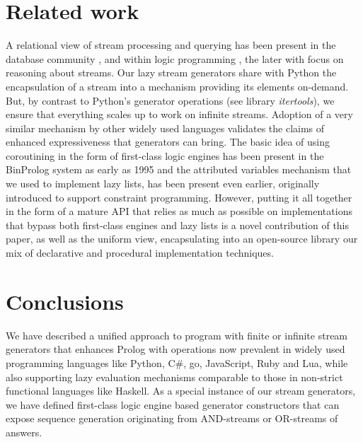\documentclass{new_tlp}
\begin{document}
\section{Related work}\label{rel}

\begin{comment}
Maybe?
\BI 
\I some history - see
\cite{tarau:parimp99,tarau:cl2000,iclp08:inter,ciclops08:pINTER}
\cite{coord11tarau}
\cite{bp2011}
\I work on delimited continuations \cite{delim}, hookable disjunction \cite{tor}
\I work on pipelines \cite{pipelines}
\EI
\end{comment}

A relational view of stream processing and querying has been 
present in the database community 
\cite{Law11,Babcock02},
and 
within logic programming 
\cite{Beck15}, %
the later with focus on
reasoning about streams.
Our lazy stream generators share with Python  \cite{pyref} the encapsulation of
a stream into a mechanism providing its elements on-demand. But, by contrast to
Python's generator operations (see library {\em itertools}), we ensure 
that everything scales up to work on infinite streams.
Adoption of a very similar mechanism by other widely
used languages validates the claims of 
enhanced expressiveness  that generators can bring.
The basic idea of using coroutining in the form of first-class logic engines
has been present in the BinProlog system  \cite{bp2011} as early as 1995 and
the attributed variables  mechanism \cite{holz92} that we used to implement 
lazy lists, has been present even earlier, originally introduced to support constraint programming. However, putting it all together
in the form of a mature API that relies as much as possible
 on implementations that bypass both first-class engines and lazy lists is a 
 novel contribution of this paper,
 as well as the uniform view,  encapsulating into an open-source library 
 our mix of declarative and procedural implementation techniques. 
 
\section{Conclusions}\label{conc}

We have described a unified approach to program with finite or infinite stream generators
that enhances Prolog with operations now prevalent in widely used programming languages
like Python, C\#, go, JavaScript, Ruby and Lua, while also supporting lazy evaluation mechanisms comparable to those in non-strict functional languages like Haskell.
As a special instance of our stream generators,
we have defined first-class logic engine based generator constructors 
that can expose sequence  generation
originating from AND-streams or OR-streams of answers.
\end{document}
